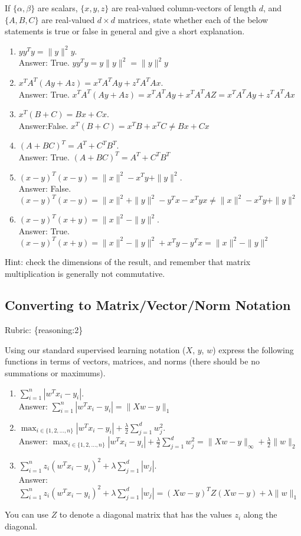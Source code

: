 \documentclass{article}
\def\rubric#1{\gre{Rubric: \{#1\}}}{}
\def\blu#1{{\color{blu}#1}}
\def\gre#1{{\color{gre}#1}}
\def\norm#1{\|#1\|}
\def\enum#1{\begin{enumerate}#1\end{enumerate}}
\begin{document}
If $\{\alpha,\beta\}$ are scalars, $\{x,y,z\}$ are real-valued column-vectors of length $d$,
and $\{A,B,C\}$ are real-valued $d\times d$ matrices, \blu{state whether each of the below statements is true or false in general
and give a short explanation.}
\enum{
\addtocounter{enumi}{6}
\item $yy^Ty = \norm{y}^2y$.
\textcolor{gre}{\\Answer: True. $yy^Ty=y\norm{y}^2=\norm{y}^2y$}
\item $x^TA^T(Ay + Az) = x^TA^TAy + z^TA^TAx$.
\textcolor{gre}{\\Answer: True. $x^TA^T(Ay + Az)=x^TA^TAy + x^TA^TAZ=x^TA^TAy + z^TA^TAx$}
\item $x^T(B + C) = Bx + Cx$.
\textcolor{gre}{\\Answer:False. $x^T(B + C)=x^TB+x^TC\neq Bx + Cx$}
\item $(A + BC)^T = A^T + C^TB^T$.
\textcolor{gre}{\\Answer: True. $(A + BC)^T=A^T+C^TB^T$}
\item $(x-y)^T(x-y) = \norm{x}^2 - x^Ty + \norm{y}^2$.
\textcolor{gre}{\\Answer: False. $(x-y)^T(x-y)=\norm{x}^2+\norm{y}^2-y^Tx-x^Tyx\neq \norm{x}^2 - x^Ty + \norm{y}^2$}
\item $(x-y)^T(x+y) = \norm{x}^2 - \norm{y}^2$.
\textcolor{gre}{\\Answer: True. $(x-y)^T(x+y)=\norm{x}^2 - \norm{y}^2+x^Ty-y^Tx=\norm{x}^2 - \norm{y}^2$}
}

Hint: check the dimensions of the result, and remember that matrix multiplication is generally not commutative.

\subsection{Converting to Matrix/Vector/Norm Notation}
\rubric{reasoning:2}

Using our standard supervised learning notation ($X$, $y$, $w$)
express the following functions in terms of vectors, matrices, and norms (there should be no summations or maximums).
\blu{\enum{
\item $\sum_{i=1}^n |w^Tx_i - y_i|$.
\textcolor{gre}{\\Answer: $\sum_{i=1}^n |w^Tx_i - y_i|=\norm{Xw-y}_{1}$}
\item $\max_{i \in \{1,2,\dots,n\}} |w^Tx_i  - y_i| + \frac{\lambda}{2}\sum_{j=1}^d w_j^2$.
\textcolor{gre}{\\Answer: $\max_{i \in \{1,2,\dots,n\}} |w^Tx_i  - y_i| + \frac{\lambda}{2}\sum_{j=1}^d w_j^2=\norm{Xw-y}_{\infty }+\frac{\lambda}{2}\norm{w}_{2}$}
\item $\sum_{i=1}^n z_i (w^Tx_i - y_i)^2 + \lambda \sum_{j=1}^{d} |w_j|$.
\textcolor{gre}{\\Answer: $\sum_{i=1}^n z_i (w^Tx_i - y_i)^2 + \lambda \sum_{j=1}^{d} |w_j|=(Xw-y)^TZ(Xw-y)+\lambda\norm{w}_{1}$}
}}
You can use $Z$ to denote a diagonal matrix that has the values $z_i$ along the diagonal.
\end{document}
